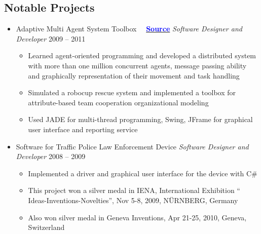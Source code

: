\documentclass[letter]{res}
\begin{document}
\begin{resume}
		
		\section{Notable Projects}
		\begin{itemize}[leftmargin=-.1in]
			\item Adaptive Multi Agent System Toolbox ~~{\href{https://github.com/omid55/team_based_rescue_jade_multi_agent_system}{\textbf{\textcolor{blue}{Source}}}} \newline
			{\sl Software Designer and Developer} \hfill 2009 – 2011\\
			\vspace{-4mm}
			\iflong
			\begin{itemize}
				\item Learned agent-oriented programming and developed a distributed system with more than one million concurrent agents, message passing ability and graphically representation of their movement and task handling
				\item Simulated a robocup rescue system and implemented a toolbox for attribute-based team cooperation organizational modeling
				\item Used JADE for multi-thread programming, Swing, JFrame for graphical user interface and reporting service
			\end{itemize}
			\fi
			
			\item Software for Traffic Police Law Enforcement Device \newline
			{\sl Software Designer and Developer} \hfill 2008 – 2009\\
			\vspace{-4mm}
			\iflong
			\begin{itemize}
				\item Implemented a driver and graphical user interface for the device with C\#
				\item This project won a silver medal in IENA, International Exhibition `` Ideas-Inventions-Novelties'', Nov 5-8, 2009, N\"{U}RNBERG, Germany
				\item Also won silver medal in Geneva Inventions, Apr 21-25, 2010, Geneva, Switzerland
			\end{itemize}
			\fi
			

\end{itemize}
\end{resume}
\end{document}
